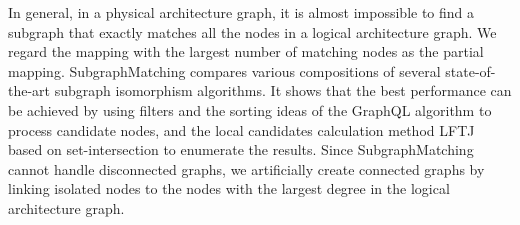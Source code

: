 \documentclass[journal]{IEEEtran}
\begin{document}
In general, in a physical architecture graph, it is almost impossible to find a subgraph that exactly matches all the nodes in a logical architecture graph. We regard the mapping with the largest number of matching nodes as the partial mapping. SubgraphMatching compares various compositions of several state-of-the-art subgraph isomorphism algorithms.  
It shows that the best performance can be achieved by using filters and the sorting ideas of the GraphQL algorithm to process candidate nodes, and the local candidates calculation method LFTJ based on set-intersection to enumerate the results. Since SubgraphMatching cannot handle disconnected graphs, we artificially create connected graphs by linking isolated nodes to the nodes with the largest degree in the logical architecture graph. %
\end{document}
